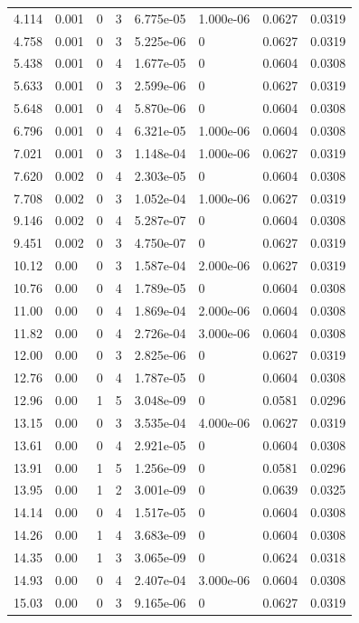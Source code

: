 \documentclass[preview]{standalone}
\begin{document}
{{\begin{tabular}{L{1.2cm}C{1.2cm} C{0.3cm}C{0.5cm} C{1.4cm}C{1.4cm} C{1.4cm}C{1.4cm}}
  4.114  &  0.001  & 0     &  3 &  6.775e-05  & 1.000e-06  & 0.0627 &  0.0319   \\ 
  4.758  &  0.001  & 0     &  3 &  5.225e-06  & 0  & 0.0627 &  0.0319   \\ 
  5.438  &  0.001  & 0     &  4 &  1.677e-05  & 0  & 0.0604 &  0.0308   \\ 
  5.633  &  0.001  & 0     &  3 &  2.599e-06  & 0  & 0.0627 &  0.0319   \\ 
  5.648  &  0.001  & 0     &  4 &  5.870e-06  & 0  & 0.0604 &  0.0308   \\ 
  6.796  &  0.001  & 0     &  4 &  6.321e-05  & 1.000e-06  & 0.0604 &  0.0308   \\ 
  7.021  &  0.001  & 0     &  3 &  1.148e-04  & 1.000e-06  & 0.0627 &  0.0319   \\ 
  7.620  &  0.002  & 0     &  4 &  2.303e-05  & 0  & 0.0604 &  0.0308   \\ 
  7.708  &  0.002  & 0     &  3 &  1.052e-04  & 1.000e-06  & 0.0627 &  0.0319   \\ 
  9.146  &  0.002  & 0     &  4 &  5.287e-07  & 0  & 0.0604 &  0.0308   \\ 
  9.451  &  0.002  & 0     &  3 &  4.750e-07  & 0  & 0.0627 &  0.0319   \\ 
  10.12  &  0.00  & 0     &  3 &  1.587e-04  & 2.000e-06  & 0.0627 &  0.0319   \\ 
  10.76  &  0.00  & 0     &  4 &  1.789e-05  & 0  & 0.0604 &  0.0308   \\ 
  11.00  &  0.00  & 0     &  4 &  1.869e-04  & 2.000e-06  & 0.0604 &  0.0308   \\ 
  11.82  &  0.00  & 0     &  4 &  2.726e-04  & 3.000e-06  & 0.0604 &  0.0308   \\ 
  12.00  &  0.00  & 0     &  3 &  2.825e-06  & 0  & 0.0627 &  0.0319   \\ 
  12.76  &  0.00  & 0     &  4 &  1.787e-05  & 0  & 0.0604 &  0.0308   \\ 
  12.96  &  0.00  & 1     &  5 &  3.048e-09  & 0  & 0.0581 &  0.0296   \\ 
  13.15  &  0.00  & 0     &  3 &  3.535e-04  & 4.000e-06  & 0.0627 &  0.0319   \\ 
  13.61  &  0.00  & 0     &  4 &  2.921e-05  & 0  & 0.0604 &  0.0308   \\ 
  13.91  &  0.00  & 1     &  5 &  1.256e-09  & 0  & 0.0581 &  0.0296   \\ 
  13.95  &  0.00  & 1     &  2 &  3.001e-09  & 0  & 0.0639 &  0.0325   \\ 
  14.14  &  0.00  & 0     &  4 &  1.517e-05  & 0  & 0.0604 &  0.0308   \\ 
  14.26  &  0.00  & 1     &  4 &  3.683e-09  & 0  & 0.0604 &  0.0308   \\ 
  14.35  &  0.00  & 1     &  3 &  3.065e-09  & 0  & 0.0624 &  0.0318   \\ 
  14.93  &  0.00  & 0     &  4 &  2.407e-04  & 3.000e-06  & 0.0604 &  0.0308   \\ 
  15.03  &  0.00  & 0     &  3 &  9.165e-06  & 0  & 0.0627 &  0.0319   \\ 
\hline 
\end{tabular} 

}}
\end{document}
